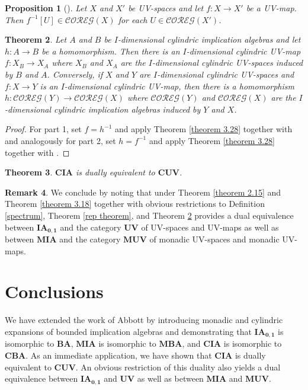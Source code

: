 \documentclass[reqno]{amsart}
\theoremstyle{plain}
\newtheorem{theorem}{Theorem}[section]
\newtheorem{proposition}[theorem]{Proposition}
\theoremstyle{definition}
\newtheorem{remark}[theorem]{Remark}
\begin{document}
 \begin{proposition}[]\label{preimage of reg is reg}
    Let $X$ and $X'$ be UV-spaces and let $f\colon X\to X'$ be a UV-map. Then $f^{-1}[U]\in\mathcal{COREG}(X)$ for each $U\in\mathcal{COREG}(X')$. 
\end{proposition}
\begin{theorem}\label{matching maps}
    Let $A$ and $B$ be $I$-dimensional cylindric implication algebras and let $h\colon A\to B$ be a homomorphism. Then there is an $I$-dimensional cylindric UV-map $f\colon X_B\to X_A$ where $X_B$ and $X_A$ are the $I$-dimensional cylindric UV-spaces induced by $B$ and $A$. Conversely, if $X$ and $Y$ are $I$-dimensional cylindric UV-spaces and $f\colon X\to Y$ is an $I$-dimensional cylindric UV-map, then there is a homomorphism $h\colon\mathcal{COREG}(Y)\to\mathcal{COREG}(X)$ where $\mathcal{COREG}(Y)$ and $\mathcal{COREG}(X)$ are the $I$-dimensional cylindric implication algebras induced by $Y$ and $X$. 
\end{theorem}
\begin{proof}
    For part 1, set $f=h^{-1}$ and apply Theorem \ref{theorem 3.28} together with \cite[Theorem 7.11]{mcdonald2} and analogously for part 2, set $h=f^{-1}$ and apply Theorem \ref{theorem 3.28} together with \cite[Theorem 7.11]{mcdonald2}. 
\end{proof}
\begin{theorem}
    $\mathbf{CIA}$ is dually equivalent to $\mathbf{CUV}$. 
\end{theorem}

\begin{remark}
    We conclude by noting that under Theorem \ref{theorem 2.15} and Theorem \ref{theorem 3.18} together with obvious restrictions to Definition \ref{spectrum}, Theorem \ref{rep theorem}, and Theorem \ref{matching maps} provides a dual equivalence between $\mathbf{IA_{0,1}}$ and the category $\mathbf{UV}$ of UV-spaces and UV-maps as well as between $\mathbf{MIA}$ and the category $\mathbf{MUV}$ of monadic UV-spaces and monadic UV-maps. 
\end{remark}
\section{Conclusions}
We have extended the work of Abbott \cite{abbott672} by introducing monadic and cylindric expansions of bounded implication algebras and demonstrating that $\mathbf{IA_{0,1}}$ is isomorphic to $\mathbf{BA}$, $\mathbf{MIA}$ is isomorphic to $\mathbf{MBA}$, and $\mathbf{CIA}$ is isomorphic to $\mathbf{CBA}$. As an immediate application, we have shown that $\mathbf{CIA}$ is dually equivalent to $\mathbf{CUV}$. An obvious restriction of this duality also yields a dual equivalence between $\mathbf{IA_{0,1}}$ and $\mathbf{UV}$ as well as between $\mathbf{MIA}$ and $\mathbf{MUV}$.   
\end{document}
